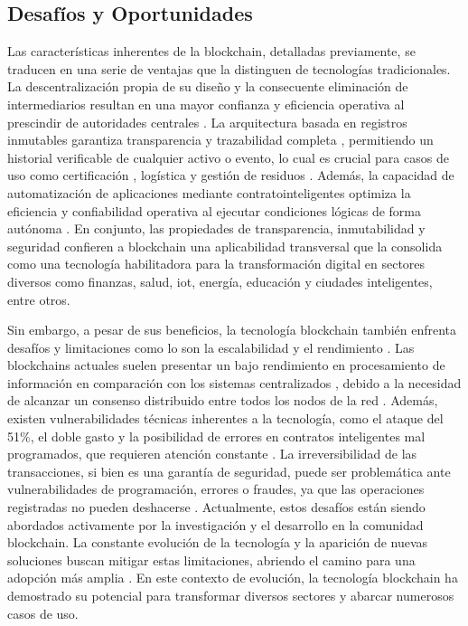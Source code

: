 \subsection{Desafíos y Oportunidades}

Las características inherentes de la blockchain, detalladas previamente, se traducen en una serie de ventajas que la distinguen de tecnologías tradicionales. La descentralización propia de su diseño y la consecuente eliminación de intermediarios resultan en una mayor confianza \cite{rejeb2023role} y eficiencia operativa al prescindir de autoridades centrales \cite{sharabati2024blockchain}. La arquitectura basada en registros inmutables garantiza transparencia y \gls{trazabilidad} completa \cite{sharabati2024blockchain}, permitiendo un historial verificable de cualquier activo o evento, lo cual es crucial para casos de uso como certificación \cite{bartolomeo2020introduccion}, logística \cite{bartolomeo2020introduccion, rejeb2023role} y gestión de residuos \cite{bulkowska2023implementation}. Además, la capacidad de automatización de aplicaciones mediante \glspl{contratointeligente} optimiza la eficiencia y confiabilidad operativa al ejecutar condiciones lógicas de forma autónoma \cite{bartolomeo2020introduccion}. En conjunto, las propiedades de transparencia, inmutabilidad y seguridad confieren a blockchain una aplicabilidad transversal que la consolida como una tecnología habilitadora para la transformación digital en sectores diversos como finanzas, salud, \acrshort{iot}, energía, educación y ciudades inteligentes, entre otros.

Sin embargo, a pesar de sus beneficios, la tecnología blockchain también enfrenta desafíos y limitaciones como lo son la escalabilidad y el rendimiento \cite{tripathi2023comprehensive}. Las blockchains actuales suelen presentar un bajo rendimiento en procesamiento de información en comparación con los sistemas centralizados \cite{baralla2023waste}, debido a la necesidad de alcanzar un consenso distribuido entre todos los \glspl{nodo} de la red \cite{tripathi2023comprehensive}. Además, existen vulnerabilidades técnicas inherentes a la tecnología, como el ataque del 51\%, el doble gasto y la posibilidad de errores en contratos inteligentes mal programados, que requieren atención constante \cite{diez2023web}. La irreversibilidad de las transacciones, si bien es una garantía de seguridad, puede ser problemática ante vulnerabilidades de programación, errores o fraudes, ya que las operaciones registradas no pueden deshacerse \cite{taherdoost2023smart}. Actualmente, estos desafíos están siendo abordados activamente por la investigación y el desarrollo en la comunidad blockchain. La constante evolución de la tecnología y la aparición de nuevas soluciones buscan mitigar estas limitaciones, abriendo el camino para una adopción más amplia \cite{tripathi2023comprehensive, baralla2023waste, taherdoost2023smart}. En este contexto de evolución, la tecnología blockchain ha demostrado su potencial para transformar diversos sectores y abarcar numerosos casos de uso.

